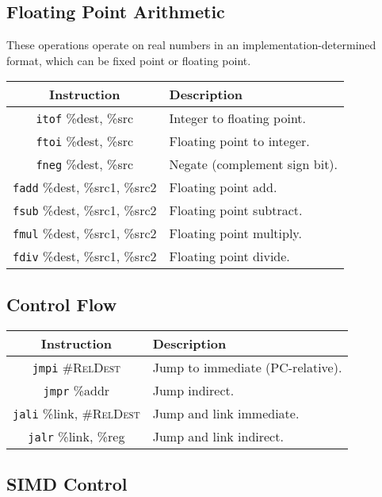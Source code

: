\documentclass[10pt,letterpaper]{article}
\begin{document}
\subsection{Floating Point Arithmetic}
These operations operate on real numbers in an implementation-determined
format, which can be fixed point or floating point.

\begin{center}
\begin{tabular}{cl}
\textbf{Instruction}&\textbf{Description}\\
\hline
\texttt{itof} \%dest, \%src&Integer to floating point.\\
\texttt{ftoi} \%dest, \%src&Floating point to integer.\\
\texttt{fneg} \%dest, \%src&Negate (complement sign bit).\\
\texttt{fadd} \%dest, \%src1, \%src2&Floating point add.\\
\texttt{fsub} \%dest, \%src1, \%src2&Floating point subtract.\\
\texttt{fmul} \%dest, \%src1, \%src2&Floating point multiply.\\
\texttt{fdiv} \%dest, \%src1, \%src2&Floating point divide.\\
\end{tabular}
\end{center}

\subsection{Control Flow}

\begin{center}
\begin{tabular}{cl}
\textbf{Instruction}&\textbf{Description}\\
\hline
\texttt{jmpi} \textsc{\#RelDest}&Jump to immediate (PC-relative).\\
\texttt{jmpr} \%addr&Jump indirect.\\
\texttt{jali} \%link, \textsc{\#RelDest}&Jump and link immediate.\\
\texttt{jalr} \%link, \%reg&Jump and link indirect.\\
\end{tabular}
\end{center}

\subsection{SIMD Control}
\end{document}
